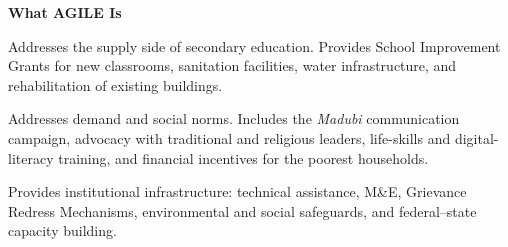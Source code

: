 \documentclass[11pt,landscape,letterpaper]{article}
\begin{document}
\begin{minipage}[t]{0.46\textwidth}
  {\color{navy}\fontsize{22}{28}\selectfont\bfseries What AGILE Is}

  \vspace{0.6cm}

  \begin{tcolorbox}[componentbox, title={\bfseries\fontsize{11}{14}\selectfont Component 1\,---\, Safe \& Accessible Learning Spaces}]
    \fontsize{10}{13}\selectfont
    Addresses the supply side of secondary education. Provides School Improvement
    Grants for new classrooms, sanitation facilities, water infrastructure,
    and rehabilitation of existing buildings.
  \end{tcolorbox}

  \vspace{0.35cm}

  \begin{tcolorbox}[componentbox, title={\bfseries\fontsize{11}{14}\selectfont Component 2\,---\, Fostering an Enabling Environment}]
    \fontsize{10}{13}\selectfont
    Addresses demand and social norms. Includes the \textit{Madubi} communication
    campaign, advocacy with traditional and religious leaders, life-skills
    and digital-literacy training, and financial incentives for the poorest
    households.
  \end{tcolorbox}

  \vspace{0.35cm}

  \begin{tcolorbox}[componentbox, title={\bfseries\fontsize{11}{14}\selectfont Component 3\,---\, System Strengthening}]
    \fontsize{10}{13}\selectfont
    Provides institutional infrastructure: technical assistance, M\&E,
    Grievance Redress Mechanisms, environmental and social safeguards,
    and federal--state capacity building.
  \end{tcolorbox}
\end{minipage}
\hfill
\end{document}
